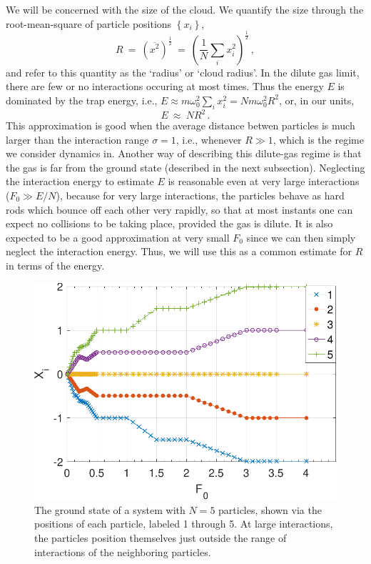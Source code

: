 \documentclass[a4paper, onecolumn]{revtex4-1}
\begin{document}
We will be concerned with the size of the cloud.  We quantify the size through the root-mean-square
of particle positions $\left\lbrace x_i\right\rbrace$, 
\begin{equation}
R ~=~ \left(\overline{x^2}\right)^\frac{1}{2} ~=~ \left(\frac{1}{N}\sum_i{x_i^2}\right)^\frac{1}{2} \, ,
\label{eq:def_of_R}
\end{equation}
and refer to this quantity as the `radius' or `cloud radius'.
%
In the dilute gas limit, there are few or no interactions occuring at most times.  Thus the energy
$E$ is dominated by the trap energy, i.e., $E\approx m\omega_0^2\sum_{i}x_i^2= Nm\omega_0^2R^2$, or,
in our units,
\begin{equation}
  E ~\approx~ NR^2 \, .
  \label{eq:E_and_R}
\end{equation}
%
This approximation is good when the average distance betwen particles is much larger than the
interaction range $\sigma=1$, i.e., whenever $R\gg1$, which is the regime we consider dynamics in.
Another way of describing this dilute-gas regime is that the gas is far from the ground state
(described in the next subsection).  Neglecting the interaction energy to estimate $E$ is reasonable
even at very large interactions ($F_0\gg E/N$), because for very large interactions, the particles
behave as hard rods which bounce off each other very rapidly, so that at most instants one can
expect no collisions to be taking place, provided the gas is dilute.  It is also expected to be a
good approximation at very small $F_0$ since we can then simply neglect the interaction energy.
Thus, we will use this as a common estimate for $R$ in terms of the energy.


\begin{figure}[tbhp]
\centering
\includegraphics[scale=0.65]{ZhiyuPictures/N_5_GS_pre_2_rev-crop.pdf}
\caption{The ground state of a system with $N=5$ particles, shown via the positions of each
  particle, labeled 1 through 5.  At large interactions, the particles position themselves just
  outside the range of interactions of the neighboring particles.}
\label{fig:GS1}
\end{figure}
\end{document}

